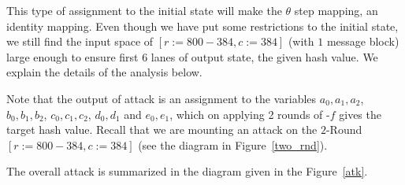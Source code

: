 This type of assignment to the initial state will make the {$\theta$} step mapping, an identity mapping. Even though we have put some restrictions to the initial state, we still find the input space of \KECCAK{}$[r:=800-384, c:=384]$ (with $1$ message block) large enough to ensure first $6$ lanes of output state, the given hash value. We explain the details of the analysis below. 

Note that the output of attack is an assignment to the variables $a_0, a_1, a_2$, $b_0, b_1, b_2$, $c_0, c_1, c_2$, $d_0, d_1$ and $e_0, e_1$, which on applying 2 rounds of \KECCAK-$f$ gives the target hash value. Recall that we are mounting an attack on the $2$-Round \KECCAK{}$[r:=800-384, c:=384]$ (see the diagram in Figure~\ref{two_rnd}).

%
%
The overall attack is summarized in the  diagram given in the Figure~\ref{atk}. 
%
